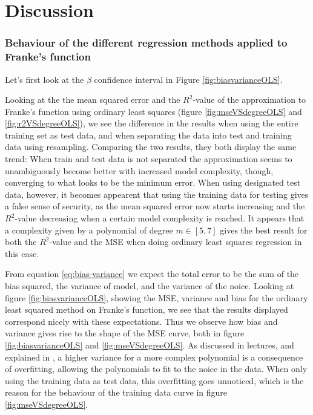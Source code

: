 \section{Discussion}
\label{sec:discussion}

\subsubsection*{Behaviour of the different regression methods applied to Franke's function}
Let's first look at the $\beta$ confidence interval in Figure \ref{fig:biasvarianceOLS}.  

Looking at the  the mean squared error and the $R^2$-value of the approximation to Franke's function using ordinary least squares (figure \ref{fig:mseVSdegreeOLS} and \ref{fig:r2VSdegreeOLS}), we see the difference in the results when using the entire training set as test data, and when separating the data into test and training data using resampling. Comparing the two results, they both display the same trend: When train and test data is not separated the approximation seems to unambiguously become better with increased model complexity, though, converging to what looks to be the minimum error. When using designated test data, however, it becomes appearent that using the training data for testing gives a false sense of security, as the mean squared error now starts increasing and the $R^2$-value decreasing when a certain model complexity is reached. It appears that a complexity given by a polynomial of degree $m \in [5,7]$ gives the best result for both the $R^2$-value and the MSE when doing ordinary least squares regression in this case.

From equation \eqref{eq:bias-variance} we expect the total error to be the sum of the bias squared, the variance of model, and the variance of the noice. Looking at figure \ref{fig:biasvarianceOLS}, showing the MSE, variance and bias for the ordinary least squared method on Franke's function, we see that the results displayed correspond nicely with these expectations. Thus we observe how bias and variance gives rise to the shape of the MSE curve, both in figure \ref{fig:biasvarianceOLS} and \ref{fig:mseVSdegreeOLS}. As discussed in lectures, and explained in \cite{hastie2009elements}, a higher variance for a more complex polynomial is a consequence of overfitting, allowing the polynomials to fit to the noice in the data. When only using the training data as test data, this overfitting goes unnoticed, which is the reason for the behaviour of the training data curve in figure \ref{fig:mseVSdegreeOLS}.

